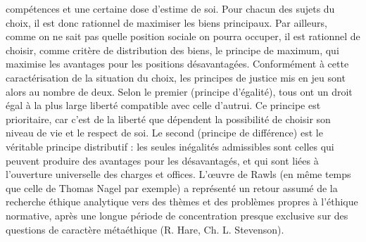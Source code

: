 compétences et une certaine dose d’estime de soi. Pour chacun des sujets du
choix, il est donc rationnel de maximiser
les biens principaux. Par ailleurs, comme
on ne sait pas quelle position sociale on
pourra occuper, il est rationnel de choisir,
comme critère de distribution des biens,
le principe de maximum, qui maximise les
avantages pour les positions désavantagées. Conformément à cette caractérisation de la situation du choix, les principes
de justice mis en jeu sont alors au nombre
de deux. Selon le premier (principe d’égalité), tous ont un droit égal à la plus large
liberté compatible avec celle d'autrui. Ce
principe est prioritaire, car c’est de la
liberté que dépendent la possibilité de
choisir son niveau de vie et le respect de
soi. Le second (principe de différence) est
le véritable principe distributif : les seules
inégalités admissibles sont celles qui peuvent produire des avantages pour les
désavantagés, et qui sont liées à l’ouverture universelle des charges et offices.
L'œuvre de Rawls (en même temps que
celle de Thomas Nagel par exemple) a
représenté un retour assumé de la
recherche éthique analytique vers des
thèmes et des problèmes propres à
l'éthique normative, après une longue
période de concentration presque exclusive sur des questions de caractère métaéthique (R. Hare, Ch. L. Stevenson).
